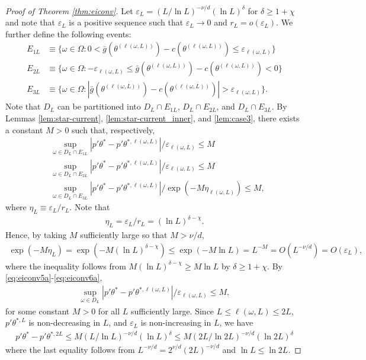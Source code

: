 \documentclass[letterpaper,11pt]{article}
\theoremstyle{myplain}
\theoremstyle{mydefinition}
\theoremstyle{myremark}
\numberwithin{equation}{section}
\numberwithin{figure}{section}
\begin{document}
\begin{appendix}
\begin{proof}[Proof of Theorem \ref{thm:eiconv}]
Let  $\varepsilon_L=(L/\ln L)^{-\nu/d}(\ln L)^\delta$ for $\delta\ge 1+\chi$ and note that $\varepsilon_L$ is a positive sequence such that $\varepsilon_L\to 0$ and $r_L=o(\varepsilon_L)$.
We further define the following events:
\begin{align}
E_{1L}&\equiv\{\omega\in\Omega:0<\bar g(\theta^{(\ell(\omega,L))})-c(\theta^{(\ell(\omega, L))})\le \varepsilon_{\ell(\omega,L)}\}\label{eq:eiconv4a}\\
E_{2L}&\equiv\{\omega\in\Omega:-\varepsilon_{\ell(\omega,L)}\le\bar g(\theta^{(\ell(\omega,L))})-c(\theta^{(\ell(\omega, L))})<0\}\label{eq:eiconv4b}\\
E_{3L}&\equiv\{\omega\in\Omega:|\bar g(\theta^{(\ell(\omega,L))})-c(\theta^{(\ell(\omega, L))})|>\varepsilon_{\ell(\omega,L)}\}.\label{eq:eiconv4c}
\end{align}
Note that $D_L$ can be partitioned into $D_L\cap E_{1L}$, $D_L\cap E_{2L}$, and $D_L\cap E_{3L}.$
By Lemmas \ref{lem:star-current}, \ref{lem:star-current_inner}, and \ref{lem:case3}, there exists a constant $M>0$ such that, respectively,
\begin{align}
&\sup_{\omega\in D_L\cap E_{1L}}|p'\theta^*-p'\theta^{*,\ell(\omega,L)}|/\varepsilon_{\ell(\omega,L)}\le M\label{eq:eiconv5a}\\
&\sup_{\omega\in D_L\cap E_{2L}}|p'\theta^*-p'\theta^{*,\ell(\omega,L)}|/\varepsilon_{\ell(\omega,L)}\le M\label{eq:eiconv5b}\\
&\sup_{\omega\in D_L\cap E_{3L}}|p'\theta^*-p'\theta^{*,\ell(\omega,L)}|/\exp(-M\eta_{\ell(\omega,L)})\le M,\label{eq:eiconv5c}
\end{align}
where $\eta_L\equiv\varepsilon_L/r_L$.  Note that
\begin{align}
	\eta_L=\varepsilon_L/r_L=(\ln L)^{\delta-\chi}.\label{eq:eiconv6}
\end{align}
Hence, by taking $M$ sufficiently large so that $M> \nu/d$,
\begin{align}
\exp(-M\eta_L)=\exp\left( -M(\ln L)^{\delta-\chi}\right)\le \exp\left(-M\ln L\right) =L^{-M}=O(L^{-\nu/d})=O(\varepsilon_L),\label{eq:eiconv6a}
\end{align}
where the inequality follows from $M(\ln L)^{\delta-\chi}\ge M\ln L$ by $\delta\ge 1+\chi$.
By \eqref{eq:eiconv5a}-\eqref{eq:eiconv6a},
\begin{align}
	\sup_{\omega\in D_L}|p'\theta^*-p'\theta^{*,\ell(\omega,L)}|/\varepsilon_{\ell(\omega,L)}\le M,\label{eq:eiconv6b}
\end{align}
for some constant $M>0$ for all $L$ sufficiently large.
Since $L\le \ell(\omega,L) \le 2L$, $p'\theta^{*,L}$ is non-decreasing in $L$, and $\varepsilon_L$ is non-increasing in $L$, we have
\begin{align}
p'\theta^*-p'\theta^{*,2L}	\le M (L/\ln L)^{-\nu/d}(\ln L)^\delta\le M(2L/\ln 2L)^{-\nu/d}(\ln 2L)^\delta \label{eq:eiconv8}
\end{align}
where the last equality follows from $L^{-\nu/d}= 2^{\nu/d} (2L)^{-\nu/d}$ and $\ln L\le \ln 2L$.


\end{proof}
\end{appendix}
\end{document}
